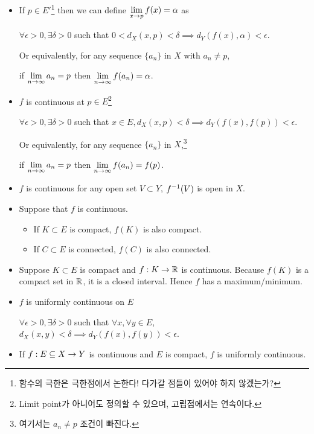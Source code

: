 \begin{itemize}
    \item If \(p \in E'\)\footnote{함수의 극한은 극한점에서 논한다! 다가갈 점들이 있어야 하지 않겠는가?} then we can define \(\displaystyle \lim_{x \rightarrow p} f(x) = \alpha\) as
          \begin{center}
              \(\forall \epsilon > 0, \exists \delta > 0\) such that \(0 < d_X(x, p) < \delta \implies d_Y(f(x), \alpha) < \epsilon\).
          \end{center}
          Or equivalently, for any sequence \(\{a_n\}\) in \(X\) with \(a_n \neq p\),
          \begin{center}
              if \(\displaystyle \lim_{n\rightarrow \infty} a_n = p\) then \(\displaystyle \lim_{n \rightarrow \infty} f(a_n) = \alpha\).
          \end{center}
    \item \(f\) is continuous at \(p \in E\)\footnote{Limit point가 아니어도 정의할 수 있으며, 고립점에서는 연속이다.} \miff
          \begin{center}
              \(\forall \epsilon > 0, \exists \delta > 0\) such that \(x \in E, d_X(x, p) < \delta \implies d_Y(f(x), f(p)) < \epsilon\).
          \end{center}
          Or equivalently, for any sequence \(\{a_n\}\) in \(X\),\footnote{여기서는 \(a_n \neq p\) 조건이 빠진다.}
          \begin{center}
              if \(\displaystyle \lim_{n\rightarrow \infty} a_n = p\) then \(\displaystyle \lim_{n \rightarrow \infty} f(a_n) = f(p)\).
          \end{center}
    \item \(f\) is continuous \miff for any open set \(V \subset Y\), \(f^{-1}(V)\) is open in \(X\).
    \item Suppose that \(f\) is continuous.
          \begin{itemize}
              \item If \(K \subset E\) is compact, \(f(K)\) is also compact.
              \item If \(C \subset E\) is connected, \(f(C)\) is also connected.
          \end{itemize}
    \item {} Suppose \(K \subset E\) is compact and \(f: K \rightarrow \mathbb{R}\) is continuous. Because \(f(K)\) is a compact set in \(\mathbb{R}\), it is a closed interval. Hence \(f\) has a maximum/minimum.
    \item {} \(f\) is uniformly continuous on \(E\) \miff
          \begin{center}
              \(\forall \epsilon > 0, \exists \delta > 0\) such that \(\forall x, \forall y \in E\), \(d_X(x, y) < \delta \implies d_Y(f(x), f(y)) < \epsilon\).
          \end{center}
    \item If \(f: E \subseteq X \rightarrow Y\) is continuous and \(E\) is compact, \(f\) is uniformly continuous.
\end{itemize}

